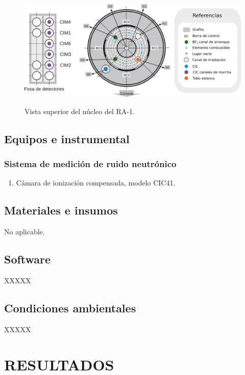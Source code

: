 \documentclass[a4paper,11pt]{article}
\begin{document}
\begin{figure}[H]
  \centering
    \captionsetup{width=16cm}
    \includegraphics[width=17.0cm]{ra1_superior.png} \\
    \caption{Vista superior del núcleo del RA-1.}\label{fig:ra1_superior}
  \end{figure}   

\subsection{Equipos e instrumental}

\subsubsection*{Sistema de medición de ruido neutrónico}

\begin{enumerate}
  \item Cámara de ionización compensada, modelo CIC41.
\end{enumerate}


\subsection{Materiales e insumos}

No aplicable.

\subsection{Software}

XXXXX

\subsection{Condiciones ambientales}

XXXXX


\section{RESULTADOS}
\end{document}
